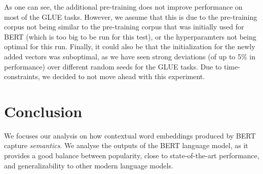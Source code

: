 \documentclass[a4paper,12pt,oneside,openright]{report}
\begin{document}

\hfill \break

As one can see, the additional pre-training does not improve performance on most of the GLUE tasks.
However, we assume that this is due to the pre-training corpus not being similar to the pre-training corpus that was initially used for BERT (which is too big to be run for this test), or the hyperparamters not being optimal for this run.
Finally, it could also be that the initialization for the newly added vectors was suboptimal, as we have seen strong deviations (of up to 5\% in performance) over different random seeds for the GLUE tasks.
Due to time-constraints, we decided to not move ahead with this experiment.

\chapter{Conclusion}\label{section:Conclusion}

We focuses our analysis on how contextual word embeddings produced by BERT capture \textit{semantics}. 
We analyse the outputs of the BERT language model, as it provides a good balance between popularity, close to state-of-the-art performance, and generalizability to other modern language models.
\end{document}
